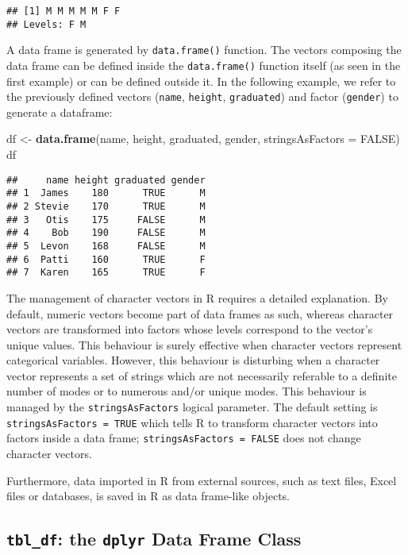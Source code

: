 \documentclass[]{book}
\newenvironment{Shaded}{\begin{snugshade}}{\end{snugshade}}
\newcommand{\KeywordTok}[1]{\textcolor[rgb]{0.13,0.29,0.53}{\textbf{{#1}}}}
\newcommand{\DataTypeTok}[1]{\textcolor[rgb]{0.13,0.29,0.53}{{#1}}}
\newcommand{\StringTok}[1]{\textcolor[rgb]{0.31,0.60,0.02}{{#1}}}
\newcommand{\OtherTok}[1]{\textcolor[rgb]{0.56,0.35,0.01}{{#1}}}
\newcommand{\NormalTok}[1]{{#1}}
\begin{document}
\begin{verbatim}
## [1] M M M M M F F
## Levels: F M
\end{verbatim}

A data frame is generated by \texttt{data.frame()} function. The vectors
composing the data frame can be defined inside the \texttt{data.frame()}
function itself (as seen in the first example) or can be defined outside
it. In the following example, we refer to the previously defined vectors
(\texttt{name}, \texttt{height}, \texttt{graduated}) and factor
(\texttt{gender}) to generate a dataframe:

\begin{Shaded}
\begin{Highlighting}[]
\NormalTok{df <-}\StringTok{ }\KeywordTok{data.frame}\NormalTok{(name, height, graduated, gender, }\DataTypeTok{stringsAsFactors =} \OtherTok{FALSE}\NormalTok{)}
\NormalTok{df}
\end{Highlighting}
\end{Shaded}

\begin{verbatim}
##     name height graduated gender
## 1  James    180      TRUE      M
## 2 Stevie    170      TRUE      M
## 3   Otis    175     FALSE      M
## 4    Bob    190     FALSE      M
## 5  Levon    168     FALSE      M
## 6  Patti    160      TRUE      F
## 7  Karen    165      TRUE      F
\end{verbatim}

The management of character vectors in R requires a detailed
explanation. By default, numeric vectors become part of data frames as
such, whereas character vectors are transformed into factors whose
levels correspond to the vector's unique values. This behaviour is
surely effective when character vectors represent categorical variables.
However, this behaviour is disturbing when a character vector represents
a set of strings which are not necessarily referable to a definite
number of modes or to numerous and/or unique modes. This behaviour is
managed by the \texttt{stringsAsFactors} logical parameter. The default
setting is \texttt{stringsAsFactors\ =\ TRUE} which tells R to transform
character vectors into factors inside a data frame;
\texttt{stringsAsFactors\ =\ FALSE} does not change character vectors.

Furthermore, data imported in R from external sources, such as text
files, Excel files or databases, is saved in R as data frame-like
objects.

\subsection{\texorpdfstring{\texttt{tbl\_df}: the \texttt{dplyr} Data
Frame
Class}{tbl\_df: the dplyr Data Frame Class}}\label{tbl_df-the-dplyr-data-frame-class}
\end{document}
